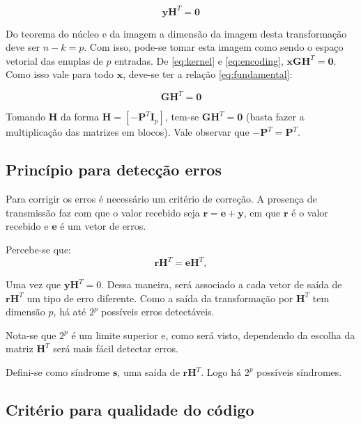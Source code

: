 \begin{equation}
	\textbf{y}\textbf{H}^T = \textbf{0}
	\label{eq:kernel}
\end{equation}

Do teorema do núcleo e da imagem a dimensão da imagem desta transformação deve ser $n-k = p$. Com isso, pode-se tomar esta imagem como sendo o espaço vetorial das enuplas de $p$ entradas. De \ref{eq:kernel} e \ref{eq:encoding},  $\textbf{x}\textbf{G}\textbf{H}^T =\textbf{0}$. Como isso vale para todo $\textbf{x}$, deve-se ter a relação \ref{eq:fundamental}:

\begin{equation}
	\textbf{G}\textbf{H}^T =\textbf{0}
	\label{eq:fundamental}
\end{equation}

Tomando $\textbf{H}$ da forma $\textbf{H} = [-\textbf{P}^T\textbf{I}_p]$, tem-se $\textbf{G}\textbf{H}^T = \textbf{0}$ (basta fazer a multiplicação das matrizes em blocos). Vale observar que $-\textbf{P}^T = \textbf{P}^T$.

\subsection{Princípio para detecção erros}

Para corrigir os erros é necessário um critério de correção. A presença de transmissão faz com que o valor recebido seja $\textbf{r} = \textbf{e}+\textbf{y}$, em que $\textbf{r}$ é o valor recebido e $\textbf{e}$ é um vetor de erros. 

Percebe-se que: 
\begin{equation}
    \textbf{r}\textbf{H}^T = \textbf{e}\textbf{H}^T,
    \label{eq:decoding}
\end{equation}

Uma vez que $\textbf{y}\textbf{H}^T = 0$. Dessa maneira, será associado a cada vetor de saída de $\textbf{r}\textbf{H}^T$ um tipo de erro diferente. Como a saída da transformação por $\textbf{H}^T$ tem dimensão $p$, há até $2^p$ possíveis erros detectáveis.

Nota-se que $2^p$ é um limite superior e, como será visto, dependendo da escolha da matriz $\textbf{H}^T$ será mais fácil detectar erros.

Defini-se como síndrome $\textbf{s}$, uma saída de $\textbf{r}\textbf{H}^T$. Logo há $2^p$ possíveis síndromes.

\subsection{Critério para qualidade do código}

